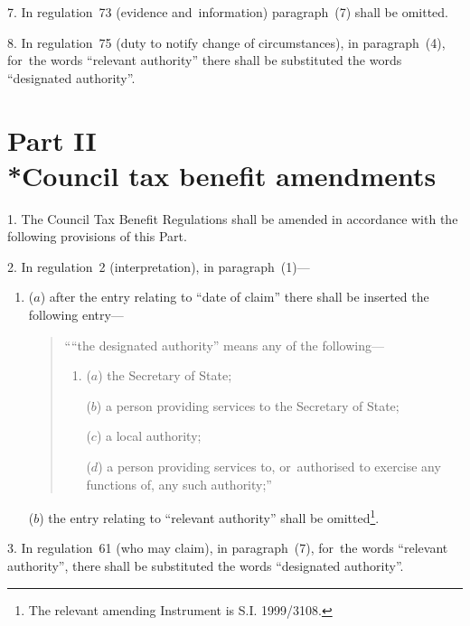 \documentclass[12pt,a4paper]{article}
\begin{document}
\medskip

7.  In regulation~73 (evidence and~information) paragraph~(7) shall be omitted.

\medskip

8.  In regulation~75 (duty to notify change of circumstances), in paragraph~(4), for~the words “relevant authority” there shall be substituted the words “designated authority”.

\section[Part II --- Council tax benefit amendments]{Part II\\*Council tax benefit amendments}

\renewcommand\parthead{--- Schedule~4 Part II}

1.  The Council Tax Benefit Regulations shall be amended in accordance with the following provisions of this Part.

\medskip

2.  In regulation~2 (interpretation), in paragraph~(1)—
\begin{enumerate}\item[]
($a$) after the entry relating to “date of claim” there shall be inserted the following entry—
\begin{quotation}
    ““the designated authority” means any of the following—
\begin{enumerate}\item[]
    ($a$) 
    the Secretary of State;

    ($b$) 
    a person providing services to the Secretary of State;

    ($c$) 
    a local authority;

    ($d$) 
    a person providing services to, or~authorised to exercise any functions of, any such authority;” 
\end{enumerate}
\end{quotation}

($b$) the entry relating to “relevant authority” shall be omitted\footnote{\frenchspacing The relevant amending Instrument is S.I. 1999/3108.}.
\end{enumerate}

\medskip

3.  In regulation~61 (who may claim), in paragraph~(7), for~the words “relevant authority”, there shall be substituted the words “designated authority”.

\medskip
\end{document}
